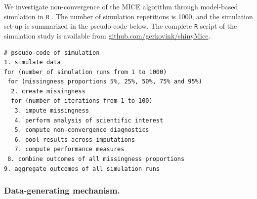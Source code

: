 \documentclass[Royal,times,sageh]{sagej}
\begin{document}
We investigate non-convergence of the MICE algorithm through model-based simulation in \texttt{R} \citep[version 3.6.3;][]{R}. The number of simulation repetitions is 1000, and the simulation set-up is summarized in the pseudo-code below. The complete \texttt{R} script of the simulation study is available from \href{https://github.com/gerkovink/shinyMice/tree/master/3.Thesis/}{github.com/gerkovink/shinyMice}.

\begin{verbatim}
# pseudo-code of simulation 
1. simulate data 
for (number of simulation runs from 1 to 1000)
 for (missingness proportions 5%, 25%, 50%, 75% and 95%)
  2. create missingness
  for (number of iterations from 1 to 100)
   3. impute missingness
   4. perform analysis of scientific interest
   5. compute non-convergence diagnostics 
   6. pool results across imputations
   7. compute performance measures
 8. combine outcomes of all missingness proportions
9. aggregate outcomes of all simulation runs 
\end{verbatim}

\hypertarget{data-generating-mechanism.}{%
\subsubsection{Data-generating mechanism.}\label{data-generating-mechanism.}}
\end{document}
